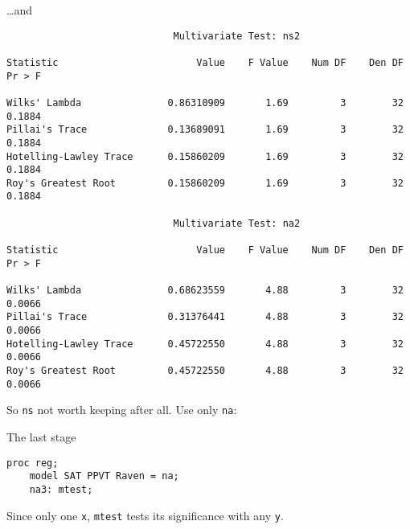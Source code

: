 \begin{frame}[fragile]{\ldots and}

{\scriptsize
\begin{verbatim}
                             Multivariate Test: ns2

Statistic                        Value    F Value    Num DF    Den DF    Pr > F

Wilks' Lambda               0.86310909       1.69         3        32    0.1884
Pillai's Trace              0.13689091       1.69         3        32    0.1884
Hotelling-Lawley Trace      0.15860209       1.69         3        32    0.1884
Roy's Greatest Root         0.15860209       1.69         3        32    0.1884

                             Multivariate Test: na2

Statistic                        Value    F Value    Num DF    Den DF    Pr > F

Wilks' Lambda               0.68623559       4.88         3        32    0.0066
Pillai's Trace              0.31376441       4.88         3        32    0.0066
Hotelling-Lawley Trace      0.45722550       4.88         3        32    0.0066
Roy's Greatest Root         0.45722550       4.88         3        32    0.0066

\end{verbatim}
}

So \texttt{ns} not worth keeping after all. Use only \texttt{na}:
  
\end{frame}

\begin{frame}[fragile]{The last stage}

\begin{verbatim}
proc reg;
    model SAT PPVT Raven = na;
    na3: mtest;
\end{verbatim}

Since only one \texttt{x}, \texttt{mtest} tests its significance with
any \texttt{y}.
  
\end{frame}

